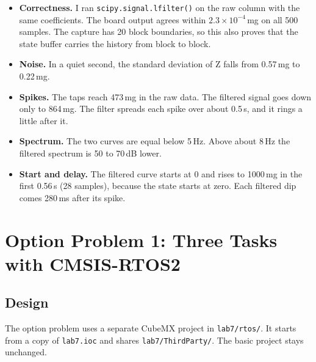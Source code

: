 \documentclass[11pt,a4paper]{article}
\begin{document}
\begin{itemize}
  \item \textbf{Correctness.} I ran \texttt{scipy.signal.lfilter()} on the
        raw column with the same coefficients. The board output agrees within
        $2.3 \times 10^{-4}$\,mg on all 500 samples. The capture has 20 block
        boundaries, so this also proves that the state buffer carries the
        history from block to block.
  \item \textbf{Noise.} In a quiet second, the standard deviation of Z falls
        from 0.57\,mg to 0.22\,mg.
  \item \textbf{Spikes.} The taps reach 473\,mg in the raw data. The filtered
        signal goes down only to 864\,mg. The filter spreads each spike over
        about 0.5\,s, and it rings a little after it.
  \item \textbf{Spectrum.} The two curves are equal below 5\,Hz. Above about
        8\,Hz the filtered spectrum is 50 to 70\,dB lower.
  \item \textbf{Start and delay.} The filtered curve starts at 0 and rises to
        1000\,mg in the first 0.56\,s (28 samples), because the state starts
        at zero. Each filtered dip comes 280\,ms after its spike.
\end{itemize}

\section{Option Problem 1: Three Tasks with CMSIS-RTOS2}

\subsection{Design}

The option problem uses a separate CubeMX project in \texttt{lab7/rtos/}. It
starts from a copy of \texttt{lab7.ioc} and shares \texttt{lab7/ThirdParty/}.
The basic project stays unchanged.
\end{document}
